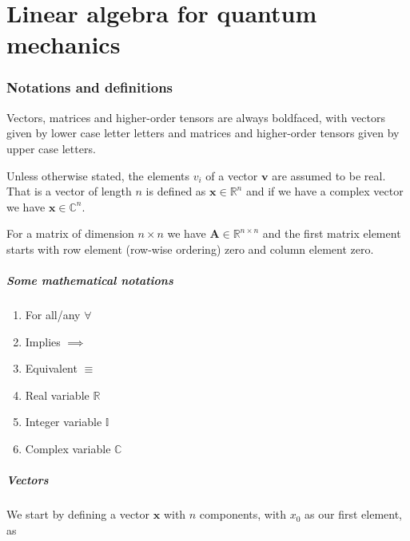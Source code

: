 \chapter{Linear algebra for quantum mechanics}

\subsection{Notations and definitions}

Vectors, matrices and higher-order tensors are always boldfaced, with vectors
given by lower case letter letters and matrices and higher-order tensors given by upper case letters.

Unless otherwise stated, the elements $v_i$ of a vector $\bm{v}$ are assumed to be real. That is a vector of length $n$ is defined as
$\bm{x}\in \mathbb{R}^{n}$ and if we have a complex vector we have $\bm{x}\in \mathbb{C}^{n}$.

For a matrix of dimension $n\times n$ we have 
$\bm{A}\in \mathbb{R}^{n\times n}$ and the first matrix element starts with row element (row-wise ordering) zero and column element zero.


\paragraph{Some  mathematical notations}
\begin{enumerate}
\item For all/any  $\forall$

\item Implies $\implies$

\item Equivalent $\equiv$

\item Real variable $\mathbb{R}$

\item Integer variable $\mathbb{I}$

\item Complex  variable $\mathbb{C}$
\end{enumerate}



\paragraph{Vectors}

We start by defining a vector $\bm{x}$  with $n$ components, with $x_0$ as our first element, as

